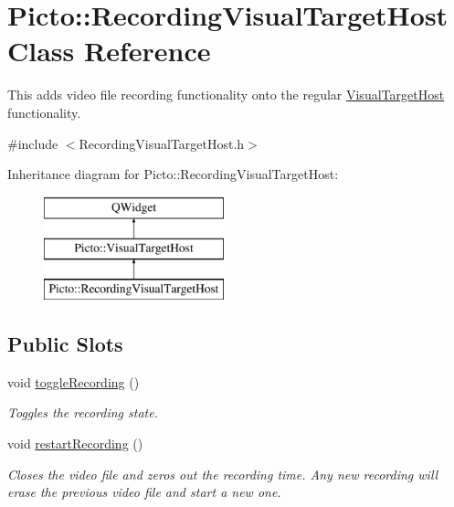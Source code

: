 \hypertarget{class_picto_1_1_recording_visual_target_host}{\section{Picto\-:\-:Recording\-Visual\-Target\-Host Class Reference}
\label{class_picto_1_1_recording_visual_target_host}
}


This adds video file recording functionality onto the regular \hyperlink{class_picto_1_1_visual_target_host}{Visual\-Target\-Host} functionality.  




{\ttfamily \#include $<$Recording\-Visual\-Target\-Host.\-h$>$}

Inheritance diagram for Picto\-:\-:Recording\-Visual\-Target\-Host\-:\begin{figure}[H]
\begin{center}
\leavevmode
\includegraphics[height=3.000000cm]{class_picto_1_1_recording_visual_target_host}
\end{center}
\end{figure}
\subsection*{Public Slots}
\begin{DoxyCompactItemize}
\item 
void \hyperlink{class_picto_1_1_recording_visual_target_host_aab730312af09000401c007a3843fd918}{toggle\-Recording} ()
\begin{DoxyCompactList}\small\item\em Toggles the recording state. \end{DoxyCompactList}\item 
\hypertarget{class_picto_1_1_recording_visual_target_host_a2215ccd6296d5cc9e8b4303aa63f42e6}{void \hyperlink{class_picto_1_1_recording_visual_target_host_a2215ccd6296d5cc9e8b4303aa63f42e6}{restart\-Recording} ()}\label{class_picto_1_1_recording_visual_target_host_a2215ccd6296d5cc9e8b4303aa63f42e6}

\begin{DoxyCompactList}\small\item\em Closes the video file and zeros out the recording time. Any new recording will erase the previous video file and start a new one. \end{DoxyCompactList}\end{DoxyCompactItemize}
